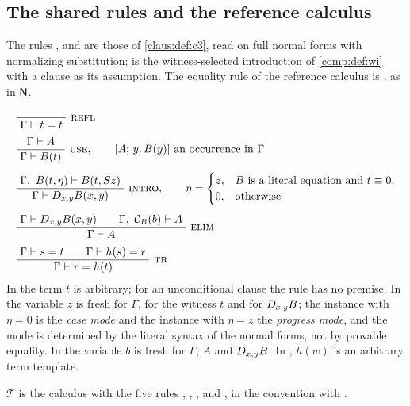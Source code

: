 \subsection{The shared rules and the reference calculus}

The rules ,  and  are those of
\cref{claus:def:c3}, read on full normal forms with normalizing
substitution;  is the witness-selected introduction of
\cref{comp:def:wi} with a clause as its assumption. The equality rule of
the reference calculus is , as in $\mathsf{N}$.

\begin{definition}
\label{disch:def:rules}
\begin{align}
 &\infrule{}{\Gamma\proves t=t}\ \rulename{Refl}
 \label{disch:eq:refl}\\[1ex]
 &\infrule{\Gamma\proves A}{\Gamma\proves B(t)}\ \rulename{Use},
 \qquad [A;\,y.\,B(y)]\text{ an occurrence in }\Gamma
 \label{disch:eq:use}\\[1ex]
 &\infrule{\Gamma,\ B(t,\eta)\proves B(t,\Suc z)}
          {\Gamma\proves\D{x}{y}B(x,y)}\ \rulename{Intro},
 \qquad
 \eta=\begin{cases}
 z,&B\text{ is a literal equation and }t\equiv 0,\\
 0,&\text{otherwise}
 \end{cases}
 \label{disch:eq:intro}\\[1ex]
 &\infrule{\Gamma\proves\D{x}{y}B(x,y)\qquad
           \Gamma,\ \mathcal C_B(b)\proves A}
          {\Gamma\proves A}\ \rulename{Elim}
 \label{disch:eq:elim}\\[1ex]
 &\infrule{\Gamma\proves s=t\qquad\Gamma\proves h(s)=r}
          {\Gamma\proves r=h(t)}\ \rulename{Tr}
 \label{disch:eq:tr}
\end{align}
In  the term $t$ is arbitrary; for an unconditional clause
the rule has no premise. In  the variable $z$ is fresh for
$\Gamma$, for the witness $t$ and for $D_{x,y}B$; the instance with
$\eta=0$ is the \emph{case mode} and the instance with $\eta=z$ the
\emph{progress mode}, and the mode is determined by the literal syntax of
the normal forms, not by provable equality. In  the
variable $b$ is fresh for $\Gamma$, $A$ and $D_{x,y}B$. In ,
$h(w)$ is an arbitrary term template.
\end{definition}

\begin{definition}
\label{disch:def:reference}
$\mathcal T$ is the calculus with the five rules ,
, ,  and , in the
convention with .
\end{definition}

